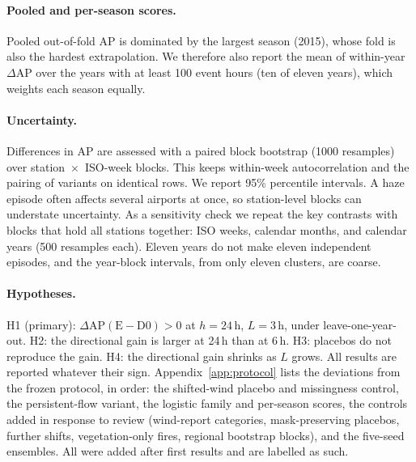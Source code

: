 \paragraph{Pooled and per-season scores.}
Pooled out-of-fold AP is dominated by the largest season (2015), whose fold is also the hardest
extrapolation. We therefore also report the mean of within-year $\Delta$AP over the years with at
least 100 event hours (ten of eleven years), which weights each season equally.

\paragraph{Uncertainty.}
Differences in AP are assessed with a paired block bootstrap (1000 resamples) over
station~$\times$~ISO-week blocks. This keeps within-week autocorrelation and the pairing of
variants on identical rows. We report 95\% percentile intervals. A haze episode often affects
several airports at once, so station-level blocks can understate uncertainty. As a sensitivity
check we repeat the key contrasts with blocks that hold all stations together: ISO weeks,
calendar months, and calendar years (500 resamples each). Eleven years do not make eleven
independent episodes, and the year-block intervals, from only eleven clusters, are coarse.

\paragraph{Hypotheses.}
H1 (primary): $\Delta\mathrm{AP}(\mathrm{E}-\mathrm{D0})>0$ at $h=24$\,h, $L=3$\,h, under
leave-one-year-out. H2: the directional gain is larger at 24\,h than at 6\,h. H3: placebos do not
reproduce the gain. H4: the directional gain shrinks as $L$ grows. All results are reported
whatever their sign. Appendix~\ref{app:protocol} lists the deviations from the frozen protocol, in
order: the shifted-wind placebo and missingness control, the persistent-flow variant, the
logistic family and per-season scores, the controls added in response to review (wind-report
categories, mask-preserving placebos, further shifts, vegetation-only fires, regional bootstrap
blocks), and the five-seed ensembles. All were added after first results and are labelled as
such.
